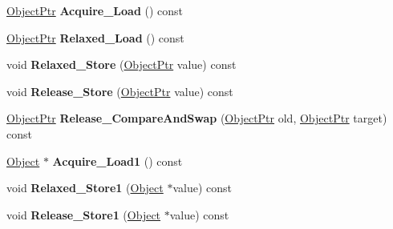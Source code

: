 \begin{DoxyCompactItemize}
\item 
\mbox{\label{classv8_1_1internal_1_1ObjectSlot_a3cb8ee46e0ea437ad4d82b25b4fa6f46}} 
\mbox{\hyperlink{classv8_1_1internal_1_1ObjectPtr}{Object\+Ptr}} {\bfseries Acquire\+\_\+\+Load} () const
\item 
\mbox{\label{classv8_1_1internal_1_1ObjectSlot_ad1d61b2e38430fc1ad47588526b624f0}} 
\mbox{\hyperlink{classv8_1_1internal_1_1ObjectPtr}{Object\+Ptr}} {\bfseries Relaxed\+\_\+\+Load} () const
\item 
\mbox{\label{classv8_1_1internal_1_1ObjectSlot_a436dd46b3ebd14ff0c6fae30e433ab28}} 
void {\bfseries Relaxed\+\_\+\+Store} (\mbox{\hyperlink{classv8_1_1internal_1_1ObjectPtr}{Object\+Ptr}} value) const
\item 
\mbox{\label{classv8_1_1internal_1_1ObjectSlot_a9dd0bf1d678fb9b749bda3618d2d6c4b}} 
void {\bfseries Release\+\_\+\+Store} (\mbox{\hyperlink{classv8_1_1internal_1_1ObjectPtr}{Object\+Ptr}} value) const
\item 
\mbox{\label{classv8_1_1internal_1_1ObjectSlot_af7ed7ef74ca5c09bbb04d80f91efaf15}} 
\mbox{\hyperlink{classv8_1_1internal_1_1ObjectPtr}{Object\+Ptr}} {\bfseries Release\+\_\+\+Compare\+And\+Swap} (\mbox{\hyperlink{classv8_1_1internal_1_1ObjectPtr}{Object\+Ptr}} old, \mbox{\hyperlink{classv8_1_1internal_1_1ObjectPtr}{Object\+Ptr}} target) const
\item 
\mbox{\label{classv8_1_1internal_1_1ObjectSlot_a05dc27aa192e826e4c12d9d7afd05b9a}} 
\mbox{\hyperlink{classv8_1_1internal_1_1Object}{Object}} $\ast$ {\bfseries Acquire\+\_\+\+Load1} () const
\item 
\mbox{\label{classv8_1_1internal_1_1ObjectSlot_ae6b49da8c1c4542297b5804a12601110}} 
void {\bfseries Relaxed\+\_\+\+Store1} (\mbox{\hyperlink{classv8_1_1internal_1_1Object}{Object}} $\ast$value) const
\item 
\mbox{\label{classv8_1_1internal_1_1ObjectSlot_ad2df3d97d1558ce975beef817d63eac0}} 
void {\bfseries Release\+\_\+\+Store1} (\mbox{\hyperlink{classv8_1_1internal_1_1Object}{Object}} $\ast$value) const
\end{DoxyCompactItemize}
